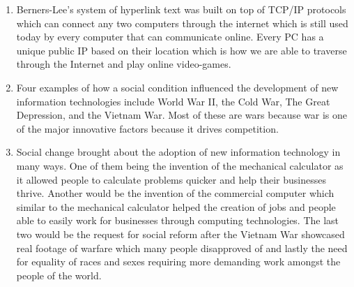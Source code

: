 \documentclass[12pt,a4paper]{article}
\begin{document}
\begin{enumerate}
        \item Berners-Lee's system of hyperlink text was built on top of TCP/IP protocols which can connect any two computers through the internet which is still used today by every computer that can communicate online. Every PC has a unique public IP based on their location which is how we are able to traverse through the Internet and play online video-games.
        \item Four examples of how a social condition influenced the development of new information technologies include World War II, the Cold War, The Great Depression, and the Vietnam War. Most of these are wars because war is one of the major innovative factors because it drives competition. 
        \item Social change brought about the adoption of new information technology in many ways. One of them being the invention of the mechanical calculator as it allowed people to calculate problems quicker and help their businesses thrive. Another would be the invention of the commercial computer which similar to the mechanical calculator helped the creation of jobs and people able to easily work for businesses through computing technologies. The last two would be the request for social reform after the Vietnam War showcased real footage of warfare which many people disapproved of and lastly the need for equality of races and sexes requiring more demanding work amongst the people of the world.
     \end{enumerate}
\end{document}
